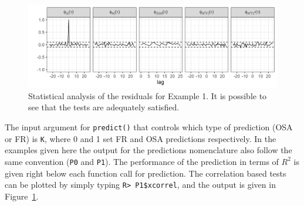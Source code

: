 \documentclass[preprint,12pt, a4paper]{elsarticle}
\begin{document}
\begin{figure}[b!]
	\centering
	\includegraphics[width=15cm,keepaspectratio]{ex1xcorrel}
	\caption{Statistical analysis of the residuals for Example 1. It is possible to see that the tests are adequately satisfied.}
	\label{fig:ex1xcorrel}
	
	
	
	
	
\end{figure}

The input argument for \verb|predict()| that controls which type of prediction (OSA or FR) is \verb|K|, where 0 and 1 set FR and OSA predictions respectively. In the examples given here the output for the predictions nomenclature also follow the same convention (\verb|P0| and \verb|P1|). The performance of the prediction in terms of $ R^2 $ is given right below each function call for prediction. The correlation based tests can be plotted by simply typing \verb|R> P1$xcorrel|, and the output is given in Figure~\ref{fig:ex1xcorrel}. 
\end{document}
